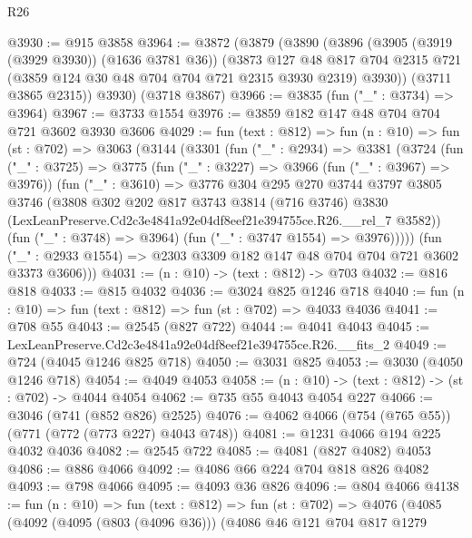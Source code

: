\begin{lexlean}{R26}
\begin{coremodule}
@3930 := @915 @3858
@3964 := @3872
    (@3879
      (@3890
        (@3896
          (@3905 (@3919 (@3929 @3930)) (@1636 @3781 @36))
          (@3873
            @127
            @48
            @817
            @704
            @2315
            @721
            (@3859 @124 @30 @48 @704 @704 @721 @2315 @3930 @2319)
            @3930))
        (@3711 @3865 @2315))
      @3930)
    (@3718 @3867)
@3966 := @3835 (fun ("_" : @3734) => @3964)
@3967 := @3733 @1554
@3976 := @3859 @182 @147 @48 @704 @704 @721 @3602 @3930 @3606
@4029 := fun (text : @812) =>
  fun (n : @10) =>
  fun (st : @702) =>
  @3063
    (@3144
      (@3301
        (fun ("_" : @2934) =>
        @3381
          (@3724
            (fun ("_" : @3725) =>
            @3775
              (fun ("_" : @3227) => @3966 (fun ("_" : @3967) => @3976))
              (fun ("_" : @3610) =>
              @3776
                @304
                @295
                @270
                @3744
                @3797
                @3805
                @3746
                (@3808
                  @302
                  @202
                  @817
                  @3743
                  @3814
                  (@716 @3746)
                  @3830
                  (LexLeanPreserve.Cd2c3e4841a92e04df8eef21e394755ce.R26.__rel_7 @3582))
                (fun ("_" : @3748) => @3964)
                (fun ("_" : @3747 @1554) => @3976)))))
        (fun ("_" : @2933 @1554) => @2303 @3309 @182 @147 @48 @704 @704 @721 @3602 @3373 @3606)))
@4031 := (n : @10) -> (text : @812) -> @703
@4032 := @816 @818
@4033 := @815 @4032
@4036 := @3024 @825 @1246 @718
@4040 := fun (n : @10) => fun (text : @812) => fun (st : @702) => @4033 @4036
@4041 := @708 @55
@4043 := @2545 (@827 @722)
@4044 := @4041 @4043
@4045 := LexLeanPreserve.Cd2c3e4841a92e04df8eef21e394755ce.R26.__fits_2
@4049 := @724 (@4045 @1246 @825 @718)
@4050 := @3031 @825
@4053 := @3030 (@4050 @1246 @718)
@4054 := @4049 @4053
@4058 := (n : @10) -> (text : @812) -> (st : @702) -> @4044 @4054
@4062 := @735 @55 @4043 @4054 @227
@4066 := @3046 (@741 (@852 @826) @2525)
@4076 := @4062 @4066 (@754 (@765 @55)) (@771 (@772 (@773 @227) @4043 @748))
@4081 := @1231 @4066 @194 @225 @4032 @4036
@4082 := @2545 @722
@4085 := @4081 (@827 @4082) @4053
@4086 := @886 @4066
@4092 := @4086 @66 @224 @704 @818 @826 @4082
@4093 := @798 @4066
@4095 := @4093 @36 @826
@4096 := @804 @4066
@4138 := fun (n : @10) =>
  fun (text : @812) =>
  fun (st : @702) =>
  @4076
    (@4085
      (@4092
        (@4095 (@803 (@4096 @36)))
        (@4086
          @46
          @121
          @704
          @817
          @1279

\end{coremodule}
\end{lexlean}
